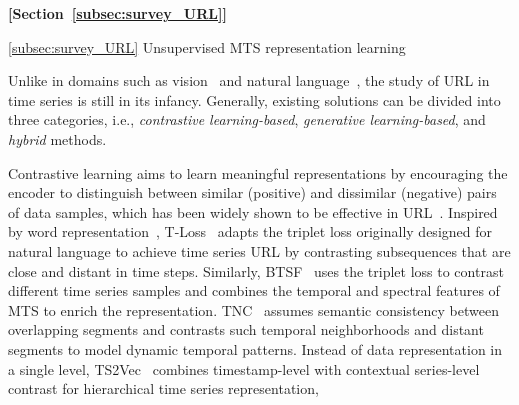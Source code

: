 \begin{sloppypar}
\begin{framed}


    \textbf{[Section~\ref{subsec:survey_URL}]}

\noindent
    \ref{subsec:survey_URL} Unsupervised MTS representation learning 
    
Unlike in domains such as vision~\cite{SimCLR,PCL,yang2022vision} and natural language~\cite{SimCSE,nlp_repr_zhang2022unsupervised}, the study of URL in time series is still in its infancy. Generally, existing solutions can be divided into three categories, i.e., \textit{contrastive learning-based}, \textit{generative learning-based}, and \textit{hybrid} methods.  


Contrastive learning aims to learn meaningful representations by encouraging the encoder to distinguish between similar (positive) and dissimilar (negative) pairs of data samples, which has been widely shown to be effective in URL~\cite{SimCLR,SimCSE}. Inspired by word representation~\cite{word2vec}, T-Loss~\cite{T-Loss} adapts the triplet loss originally designed for natural language to achieve time series URL by contrasting subsequences that are close and distant in time steps. Similarly, BTSF~\cite{BTSF} uses the triplet loss to contrast different time series samples and combines the temporal and spectral features of MTS to enrich the representation. TNC~\cite{TNC} assumes semantic consistency between overlapping segments and contrasts such temporal neighborhoods and distant segments to model dynamic temporal patterns.  Instead of data representation in a single level, TS2Vec~\cite{ts2vec} combines timestamp-level with contextual series-level contrast for hierarchical time series representation,   


\end{framed}
\end{sloppypar}
